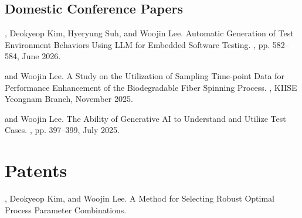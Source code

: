 \documentclass[small]{cv}
\begin{document}
\subsection*{Domestic Conference Papers }
\begin{publications}
  \item {}, Deokyeop Kim, Hyeryung Suh, and Woojin Lee\corr.
        Automatic Generation of Test Environment Behaviors Using LLM for
        Embedded Software Testing.
        , pp. 582--584, June 2026.

  \item {} and Woojin Lee\corr.
        A Study on the Utilization of Sampling Time-point Data for Performance
        Enhancement of the Biodegradable Fiber Spinning Process.
        ,
        KIISE Yeongnam Branch, November 2025.

  \item {} and Woojin Lee\corr.
        The Ability of Generative AI to Understand and Utilize Test Cases.
        , pp. 397--399, July 2025.
\end{publications}

\section{Patents}
\begin{publications}
  \item {}, Deokyeop Kim, and Woojin Lee.
        A Method for Selecting Robust Optimal Process Parameter Combinations.
\end{publications}
\end{document}
